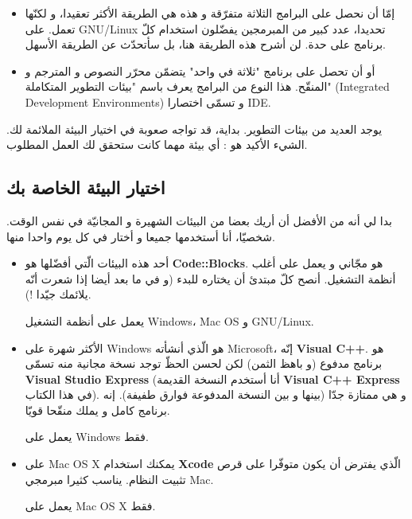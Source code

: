 \begin{itemize}
  \item إمّا أن نحصل على البرامج الثلاثة متفرّقة و هذه هي الطريقة الأكثر تعقيدا، و لكنّها تعمل. على
\textenglish{GNU/Linux}
تحديدا، عدد كبير من المبرمجين يفضّلون استخدام كلّ برنامج على حدة. لن أشرح هذه الطريقة هنا، بل سأتحدّث عن الطريقة الأسهل.
  \item أو أن تحصل على برنامج "ثلاثة في واحد" يتضمّن محرّر النصوص و المترجم و المنقّح. هذا النوع من البرامج يعرف باسم "بيئات التطوير المتكاملة"
(\textenglish{Integrated Development Environments})
و تسمّى اختصارا
\textenglish{IDE}.
\end{itemize}

يوجد العديد من بيئات التطوير. بداية، قد تواجه صعوبة في اختيار البيئة الملائمة لك. الشيء الأكيد هو : أي بيئة مهما كانت ستحقق لك العمل المطلوب.

\subsection{اختيار البيئة الخاصة بك}

بدا لي أنه من الأفضل أن أريك بعضا من البيئات الشهيرة و المجانيّة في نفس الوقت. شخصيّا، أنا أستخدمها جميعا و أختار في كل يوم  واحدا منها.

\begin{itemize}
  \item أحد هذه البيئات الّتي أفضّلها هو
\textbf{\textenglish{Code::Blocks}}.
هو مجّاني و يعمل على أغلب أنظمة التشغيل. أنصح كلّ مبتدئ أن يختاره للبدء (و في ما بعد أيضا إذا شعرت أنّه يلائمك جيّدا !).

يعمل على أنظمة التشغيل
\textenglish{Windows}،
\textenglish{Mac OS}
و
\textenglish{GNU/Linux}.
  \item الأكثر شهرة على
\textenglish{Windows}
هو الّذي أنشأته
\textenglish{Microsoft}،
إنّه
\textbf{\textenglish{Visual C++}}.
هو برنامج مدفوع (و باهظ الثمن) لكن لحسن الحظّ توجد نسخة مجانية منه تسمّى
\textbf{\textenglish{Visual Studio Express}}
(أنا أستخدم النسخة القديمة
\textbf{\textenglish{Visual C++ Express}}
في هذا الكتاب). و هي ممتازة جدّا (بينها و بين النسخة المدفوعة فوارق طفيفة). إنه برنامج كامل و يملك منقّحا قويّا.

يعمل على
\textenglish{Windows}
فقط.
  \item على
\textenglish{Mac OS X}
يمكنك استخدام
\textbf{\textenglish{Xcode}}
الّذي يفترض أن يكون متوفّرا على قرص تثبيت النظام. يناسب كثيرا مبرمجي
\textenglish{Mac}.

يعمل على
\textenglish{Mac OS X}
فقط.
\end{itemize}

